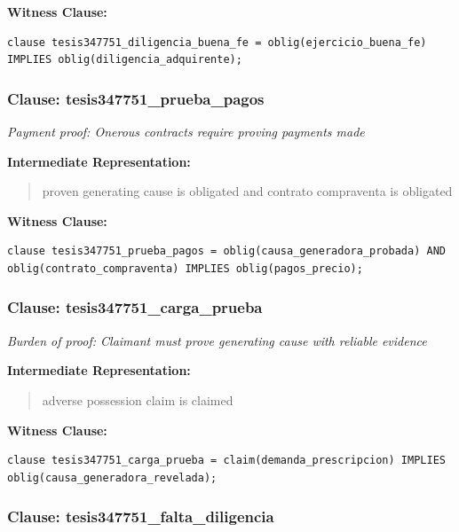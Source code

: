 \documentclass[11pt,a4paper]{article}
\begin{document}
\textbf{Witness Clause:}

\begin{lstlisting}[style=witnessstyle, language=Witness]
clause tesis347751_diligencia_buena_fe = oblig(ejercicio_buena_fe) IMPLIES oblig(diligencia_adquirente);
\end{lstlisting}

\subsubsection{Clause: tesis347751\_prueba\_pagos}

\textit{Payment proof: Onerous contracts require proving payments made}

\textbf{Intermediate Representation:}

\begin{quote}
proven generating cause is obligated and contrato compraventa is obligated
\end{quote}

\textbf{Witness Clause:}

\begin{lstlisting}[style=witnessstyle, language=Witness]
clause tesis347751_prueba_pagos = oblig(causa_generadora_probada) AND oblig(contrato_compraventa) IMPLIES oblig(pagos_precio);
\end{lstlisting}

\subsubsection{Clause: tesis347751\_carga\_prueba}

\textit{Burden of proof: Claimant must prove generating cause with reliable evidence}

\textbf{Intermediate Representation:}

\begin{quote}
adverse possession claim is claimed
\end{quote}

\textbf{Witness Clause:}

\begin{lstlisting}[style=witnessstyle, language=Witness]
clause tesis347751_carga_prueba = claim(demanda_prescripcion) IMPLIES oblig(causa_generadora_revelada);
\end{lstlisting}

\subsubsection{Clause: tesis347751\_falta\_diligencia}
\end{document}
